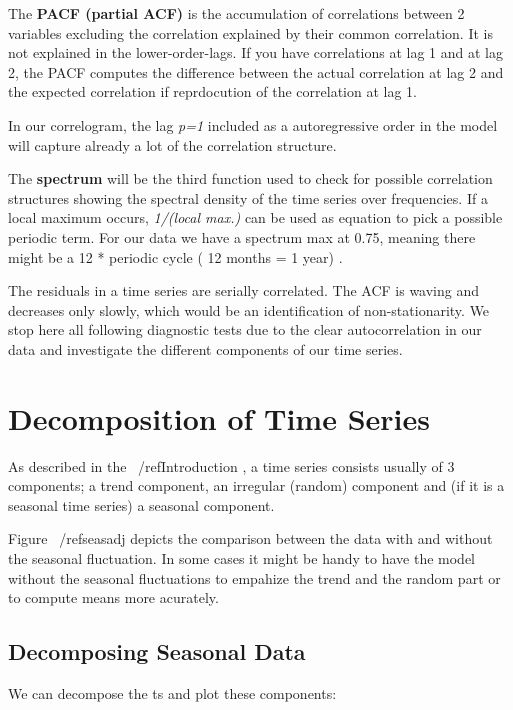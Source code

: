 \documentclass[11pt, a4paper]{article} %
\begin{document}
The \textbf{PACF (partial ACF)} is the accumulation of correlations between 2 variables excluding the correlation explained by their common correlation. It is not explained in the lower-order-lags. If you have correlations at lag 1 and at lag 2, the PACF computes the difference between the actual correlation at lag 2 and the expected correlation if reprdocution of the correlation at lag 1. 
	
	In our correlogram, the lag \emph{p=1}  included  as a autoregressive order in the model will capture already a lot of the correlation structure. 
	
	The \textbf{spectrum} will be the third function used to check for possible correlation structures  showing the spectral density of the time series over frequencies. If a local maximum occurs,  \emph{1/(local max.)} can be used as equation to pick a possible periodic term. For our data we have a spectrum max at 0.75, meaning there might be a 12 * periodic cycle ( 12 months = 1 year) . 
	
	The residuals in a time series are serially correlated. The ACF is waving and decreases only slowly, which would be an identification of non-stationarity. We stop here all following diagnostic tests due to the clear autocorrelation in our data and investigate the different components of our time series. 
  \pagebreak


\section{Decomposition of Time Series}%
As described in the ~/ref{Introduction} , a time series consists usually of 3 components; a trend component, an irregular (random) component and (if it is a seasonal time series) a seasonal component. 

Figure  ~/ref{seasadj} depicts the comparison between the data with and without the seasonal fluctuation. In some cases it might be handy to have the model without the seasonal fluctuations to empahize the trend and the random part or to compute means more acurately.  
\subsection{Decomposing Seasonal Data}%
\noindent We can decompose the ts and plot these components:
\end{document}
